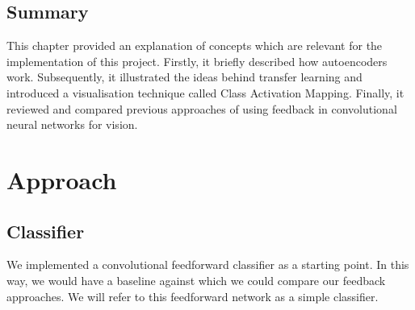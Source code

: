 \documentclass{l4proj}
\begin{document}
\section{Summary}
This chapter provided an explanation of concepts which are relevant for the implementation of this project. Firstly, it briefly described how autoencoders work. Subsequently, it illustrated the ideas behind transfer learning and introduced a visualisation technique called Class Activation Mapping. 
Finally, it reviewed and compared previous approaches of using feedback in convolutional neural networks for vision.




\chapter{Approach}

\label{chap:approach}
\section{Classifier}
\label{app:classifier}
We implemented a convolutional feedforward classifier as a starting point. In this way, we would have a baseline against which we could compare our feedback approaches. We will refer to this feedforward network as a simple classifier.
\end{document}
